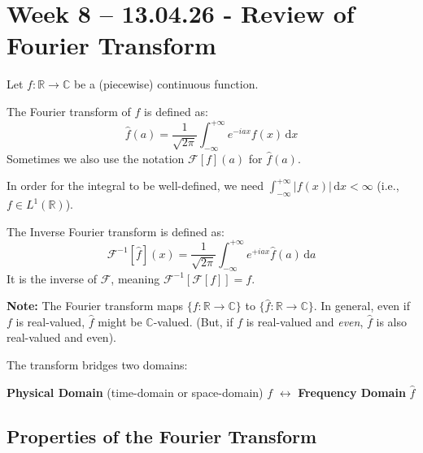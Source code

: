 \section{Week 8 -- 13.04.26 - Review of Fourier Transform}

Let $f: \mathbb{R} \to \mathbb{C}$ be a (piecewise) continuous function. 

\begin{definition}
The Fourier transform of $f$ is defined as:
\begin{equation}
    \hat{f}(a) = \frac{1}{\sqrt{2\pi}} \int_{-\infty}^{+\infty} e^{-iax} f(x) \,\mathrm{d}x
\end{equation}
Sometimes we also use the notation $\mathcal{F}[f](a)$ for $\hat{f}(a)$.
\end{definition}

In order for the integral to be well-defined, we need $\int_{-\infty}^{+\infty} |f(x)| \,\mathrm{d}x < \infty$ (i.e., $f \in L^1(\mathbb{R})$).

\begin{definition}
The Inverse Fourier transform is defined as:
\begin{equation}
    \mathcal{F}^{-1}[\hat{f}](x) = \frac{1}{\sqrt{2\pi}} \int_{-\infty}^{+\infty} e^{+iax} \hat{f}(a) \,\mathrm{d}a
\end{equation}
It is the inverse of $\mathcal{F}$, meaning $\mathcal{F}^{-1}[\mathcal{F}[f]] = f$.
\end{definition}

\textbf{Note:} The Fourier transform maps $\{f: \mathbb{R} \to \mathbb{C}\}$ to $\{\hat{f}: \mathbb{R} \to \mathbb{C}\}$. In general, even if $f$ is real-valued, $\hat{f}$ might be $\mathbb{C}$-valued. (But, if $f$ is real-valued and \emph{even}, $\hat{f}$ is also real-valued and even).

The transform bridges two domains:
\begin{center}
    \textbf{Physical Domain} (time-domain or space-domain) $f$ 
    $\longleftrightarrow$ 
    \textbf{Frequency Domain} $\hat{f}$
\end{center}

\subsection{Properties of the Fourier Transform}

